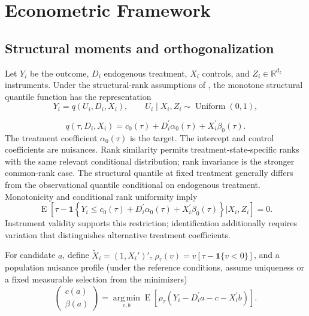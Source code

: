 \section{Econometric Framework}
\label{sec:framework}
\subsection{Structural moments and orthogonalization}
Let $Y_i$ be the outcome, $D_i$ endogenous treatment, $X_i$ controls, and $Z_i\in\mathbb R^{d_z}$ instruments. Under the structural-rank assumptions of \textcite{chernozhukov_hansen_2005}, the monotone structural quantile function has the representation
\begin{equation}
    Y_i = q(U_i,D_i,X_i),
    \qquad
    U_i \mid X_i,Z_i \sim \operatorname{Uniform}(0,1),
    \label{eq:structural-ivqr}
\end{equation}

\begin{equation}
    q(\tau,D_i,X_i)
    = c_0(\tau)
      + D_i^{\prime}\alpha_0(\tau)
      + X_i^{\prime}\beta_0(\tau).
    \label{eq:linear-structural-quantile}
\end{equation}
The treatment coefficient $\alpha_0(\tau)$ is the target. The intercept and control coefficients are nuisances. Rank similarity permits treatment-state-specific ranks with the same relevant conditional distribution; rank invariance is the stronger common-rank case. The structural quantile at fixed treatment generally differs from the observational quantile conditional on endogenous treatment. Monotonicity and conditional rank uniformity imply
\begin{equation}
    \operatorname{E}\!\left[
        \tau
        - \mathbf{1}\!\left\{
            Y_i \leq c_0(\tau)
            + D_i^{\prime}\alpha_0(\tau)
            + X_i^{\prime}\beta_0(\tau)
        \right\}
        \mathrel{\big|} X_i,Z_i
    \right]
    = 0.
    \label{eq:ivqr-conditional-moment}
\end{equation}
Instrument validity supports this restriction; identification additionally requires variation that distinguishes alternative treatment coefficients.

For candidate $a$, define $\widetilde X_i=(1,X_i')'$, $\rho_\tau(v)=v[\tau-\mathbf1\{v<0\}]$, and a population nuisance profile (under the reference conditions, assume uniqueness or a fixed measurable selection from the minimizers)
\begin{equation}
    \begin{pmatrix}
        c(a)\\
        \beta(a)
    \end{pmatrix}
    = \operatorname*{arg\,min}_{c,b}
      \operatorname{E}\!\left[
          \rho_{\tau}\!\left(Y_i-D_i^{\prime}a-c-X_i^{\prime}b\right)
      \right].
    \label{eq:profile-beta}
\end{equation}

